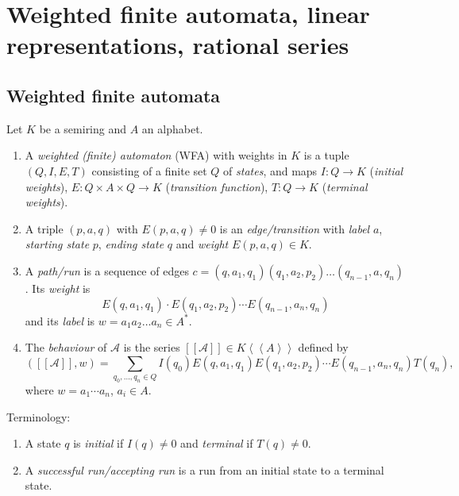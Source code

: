 \section{Weighted finite automata, linear representations, rational series}

\subsection{Weighted finite automata}


\begin{definition}
    Let $K$ be a semiring and $A$ an alphabet.
    \begin{enumerate}[(1)]
        \item A \emph{weighted (finite) automaton} (WFA) with weights in $K$ 
        is a tuple $(Q, I, E, T)$ consisting of a finite set $Q$ of \emph{states},
        and maps $I \colon Q \rightarrow K$ (\emph{initial weights}), 
        $E \colon Q \times A \times Q \rightarrow K$ (\emph{transition function}),
        $T \colon Q \to K$ (\emph{terminal weights}).
        \item A triple $(p, a, q)$ with $E(p, a, q) \neq 0$ is an 
        \emph{edge/transition} with \emph{label} $a$, \emph{starting state} 
        $p$, \emph{ending state} $q$ and \emph{weight} $E(p, a, q) \in K$.
        \item A \emph{path/run} is a sequence of edges
        $c=(q,a_1, q_1)(q_1, a_2, p_2) \dots (q_{n-1}, a, q_n)$. Its 
        \emph{weight} is 
        \[
            E(q,a_1, q_1)\cdot E(q_1, a_2, p_2) \cdots E(q_{n-1}, a_n, q_n)
        \]
        and its \emph{label} is $w = a_1a_2\dots a_n \in A^*$.
        \item The \emph{behaviour} of $\mathcal{A}$ is the series $[[\mathcal{A}]]
        \in K \left<\left<A\right>\right>$ defined by 
        \[
            ([[\mathcal{A}]], w) = \sum_{q_0, \dots, q_n \in Q} I(q_0)
            E(q,a_1, q_1)E(q_1, a_2, p_2) \cdots E(q_{n-1}, a_n, q_n)T(q_n),
        \]
        where $w = a_1\cdots a_n$, $a_i \in A$.
    \end{enumerate}
\end{definition}

\begin{definition} Terminology:
    \begin{enumerate}
        \item A state $q$ is \emph{initial} if $I(q) \neq 0$ and 
        \emph{terminal}  if $T(q) \neq 0$.
        \item A \emph{successful run/accepting run} is a run from 
        an initial state to a terminal state.
    \end{enumerate}
\end{definition}

